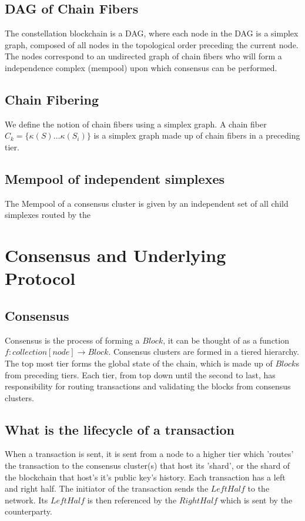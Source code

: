 \documentclass{article}
\begin{document}
\subsection{DAG of Chain Fibers}
The constellation blockchain is a DAG, where each node in the DAG is a simplex graph, composed of all nodes in the topological order preceding the current node. The nodes correspond to an undirected graph of chain fibers who will form a independence complex (mempool) upon which consensus can be performed.

\subsection{Chain Fibering}
We define the notion of chain fibers using a simplex graph. A chain fiber $C_k = \{\kappa(S) \dots \kappa(S_i) \}$ is a simplex graph made up of chain fibers in a preceding tier.

\subsection{Mempool of independent simplexes}
The Mempool of a consensus cluster is given by an independent set of all child simplexes routed by the

\section{Consensus and Underlying Protocol}
\subsection{Consensus}
Consensus is the process of forming a $Block$, it can be thought of as a function $f: collection[node] \rightarrow Block$. Consensus clusters are formed in a tiered hierarchy. The top most tier forms the global state of the chain, which is made up of $Block$s from preceding tiers. Each tier, from top down until the second to last, has responsibility for routing transactions and validating the blocks from consensus clusters. 

\subsection{What is the lifecycle of a transaction}
When a transaction is sent, it is sent from a node to a higher tier which 'routes' the transaction to the consensus cluster(s) that host its 'shard', or the shard of the blockchain that host's it's public key's history. Each transaction has a left and right half. The initiator of the transaction sends the $LeftHalf$ to the network. Its $LeftHalf$ is then referenced by the $RightHalf$ which is sent by the counterparty.
\end{document}
